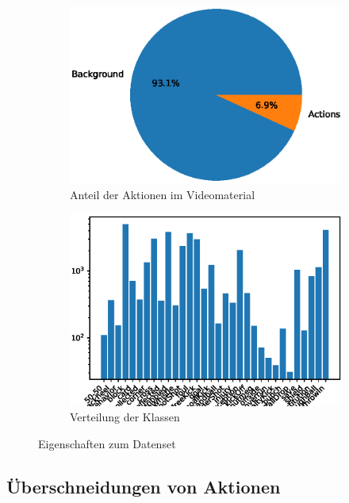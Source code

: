 \begin{figure}
    \centering
    \begin{subfigure}{.5\textwidth}
        \centering
        \includegraphics[width=.9\linewidth]{img/data-plots/background_ratio_all_annos.eps}
        \caption{Anteil der Aktionen im Videomaterial}
        \label{fig:anno_bg_ratio}
    \end{subfigure}%
    \begin{subfigure}{.5\textwidth}
        \centering
        \includegraphics[width=.95\linewidth]{img/data-plots/class_distribution_annotations_all.eps}
        \caption{Verteilung der Klassen}
        \label{fig:anno_classes}
    \end{subfigure}
    \caption{Eigenschaften zum Datenset}
    \label{fig:annotations}
\end{figure}


\subsection{Überschneidungen von Aktionen}
\label{sec:multi-label}

